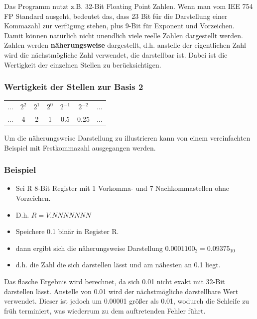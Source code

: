 \documentclass[12pt]{article}
\begin{document}
Das Programm nutzt z.B. 32-Bit Floating Point Zahlen. Wenn man vom IEE 754 FP Standard ausgeht, bedeutet das, dass 23 Bit für die Darstellung einer Kommazahl zur verfügung stehen, plus 9-Bit für Exponent und Vorzeichen. Damit können natürlich nicht unendlich viele reelle Zahlen dargestellt werden. Zahlen werden \textbf{näherungsweise} dargestellt, d.h. anstelle der eigentlichen Zahl wird die nächstmögliche Zahl verwendet, die darstellbar ist. Dabei ist die Wertigkeit der einzelnen Stellen zu berücksichtigen.

\subsubsection*{Wertigkeit der Stellen zur Basis 2}
\begin{table}[H]
\begin{tabular}{c c c c c c c}
	... & $ 2^{2}$ & $ 2^{1} $ & $ 2^{0} $ & $ 2^{-1} $ & $ 2^{-2} $ & ... \\
	... & 4 & 2 & 1 & 0.5 & 0.25 & ... \\
\end{tabular}
\end{table}


Um die näherungsweise Darstellung zu illustrieren kann von einem vereinfachten Beispiel mit Festkommazahl ausgegangen werden.

\subsubsection*{Beispiel}
\begin{itemize}
	\item Sei R 8-Bit Register mit 1 Vorkomma- und 7 Nachkommastellen ohne Vorzeichen.
	\item D.h. $ R = V.NNNNNNN $
	\item Speichere 0.1 binär in Register R.
	\item dann ergibt sich die näherungsweise Darstellung \textbf{$0.0001100_{2} = 0.09375_{10}$}
	\item d.h. die Zahl die sich darstellen lässt und am nähesten an 0.1 liegt.
\end{itemize}

Das flasche Ergebnis wird berechnet, da sich 0.01 nicht exakt mit 32-Bit darstellen lässt. Anstelle von 0.01 wird der nächstmögliche darstellbare Wert verwendet. Dieser ist jedoch um 0.00001 größer als 0.01, wodurch die Schleife zu früh terminiert, was wiederrum zu dem auftretenden Fehler führt.
\end{document}
